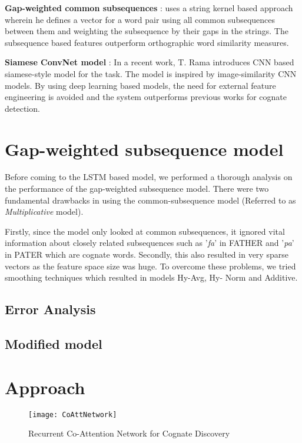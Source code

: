\documentclass[11pt,letterpaper]{article}
\begin{document}
\textbf{Gap-weighted common subsequences} : \citet{rama2015automatic} uses a string kernel based approach wherein he defines a vector for a word pair using all common subsequences between them and weighting the subsequence by their gaps in the strings. The subsequence based features outperform orthographic word similarity measures.

\textbf{Siamese ConvNet model} : In a recent work, T. Rama introduces CNN based siamese-style model \cite{rama2016siamese} for the task. The model is inspired by image-similarity CNN models. By using deep learning based models, the need for external feature engineering is avoided and the system outperforms previous works for cognate detection.

\section{Gap-weighted subsequence model}
Before coming to the LSTM based model, we performed a thorough analysis on the performance of the gap-weighted subsequence model.
There were two fundamental drawbacks in using the common-subsequence model (Referred to as \textit{Multiplicative} model). 

Firstly, since the model only looked at common subsequences, it ignored vital information about closely related subsequences such as ’\textit{fa}’ in FATHER and ’\textit{pa}’ in PATER which are cognate words. 
Secondly, this also resulted in very sparse vectors as the feature space size was huge. To overcome these problems, we tried smoothing techniques which resulted in models Hy-Avg, Hy- Norm and Additive.

\subsection{Error Analysis}
\subsection{Modified model}

\section{Approach}

\begin{figure}[ht]
	\centering
	\texttt{[image: CoAttNetwork]}
    \caption{Recurrent Co-Attention Network for Cognate Discovery}
    \label{CoAttNet}
\end{figure}
\end{document}
